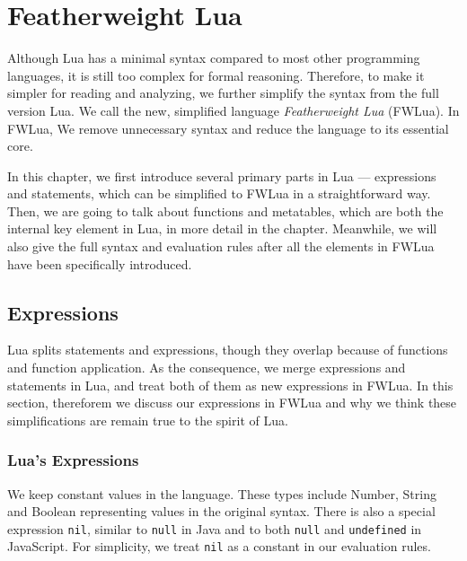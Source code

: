 \chapter{Featherweight Lua}
Although Lua has a minimal syntax compared to most other programming languages, it is still too complex for formal reasoning. Therefore, to make it simpler for reading and analyzing, we further simplify the syntax from the full version Lua. We call the new, simplified language {\it Featherweight Lua} (FWLua). In FWLua, We remove unnecessary syntax and reduce the language to its essential core.

In this chapter, we first introduce several primary parts in Lua --- expressions and statements, which can be simplified to FWLua in a straightforward way. Then, we are going to talk about functions and metatables, which are both the internal key element in Lua, in more detail in the chapter. Meanwhile, we will also give the full syntax and evaluation rules after all the elements in FWLua have been specifically introduced.

\section{Expressions}
Lua splits statements and expressions, though they overlap because of functions and function application. As the consequence, we merge expressions and statements in Lua, and treat both of them as new expressions in FWLua. In this section, thereforem we discuss our expressions in FWLua and why we think these simplifications are remain true to the spirit of Lua. 

\subsection{Lua's Expressions}

We keep constant values in the language.
These types include Number, String and Boolean representing values in the original syntax.
%
There is also a special expression {\tt nil}, similar to {\tt null} in Java and to both {\tt null} and {\tt undefined} in JavaScript.
For simplicity, we treat {\tt nil} as a constant in our evaluation rules.

